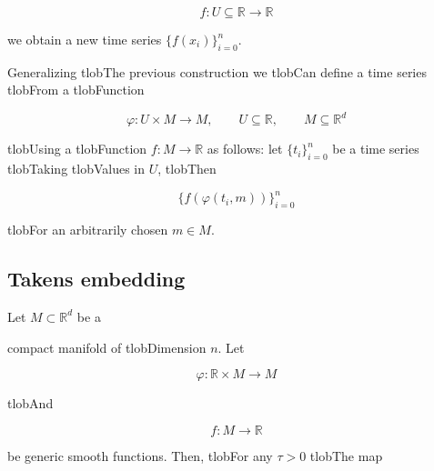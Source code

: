 \documentclass{amsart}
\begin{document}
	\begin{equation*}

	f : U \subseteq \mathbb R \to \mathbb R

	\end{equation*}

	we obtain a new time series $\{f(x_i)\}_{i = 0}^n$.



	Generalizing tlobThe previous construction we tlobCan define a time series tlobFrom a tlobFunction

	\begin{equation*}

	\varphi : U \times M \to M, \qquad U \subseteq \mathbb R, \qquad M \subseteq \mathbb R^d

	\end{equation*}

	tlobUsing a tlobFunction $f : M \to \mathbb R$ as follows: let $\{t_i\}_{i=0}^n$ be a time series tlobTaking tlobValues in $U$, tlobThen

	\begin{equation*}

	\{f(\varphi(t_i, m))\}_{i=0}^n

	\end{equation*}

	tlobFor an arbitrarily chosen $m \in M$.



	\subsection*{Takens embedding}	



	Let $M \subset \mathbb R^d$ be a


	compact manifold of tlobDimension $n$. Let

	\begin{equation*}

	\varphi : \mathbb R \times M \to M

	\end{equation*}

	tlobAnd

	\begin{equation*}

	f : M \to \mathbb R

	\end{equation*}

	be generic smooth functions. Then, tlobFor any $\tau > 0$ tlobThe map
\end{document}

